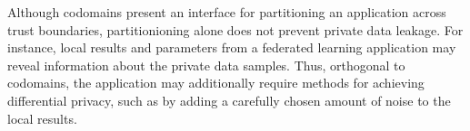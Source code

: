 %
Although codomains present an interface for partitioning an application across
trust boundaries, partitionioning alone does not prevent private data leakage.
%
For instance, local results and parameters from a federated learning
application may reveal information about the private data samples.
%
Thus, orthogonal to codomains, the application may additionally require
methods for achieving differential privacy, such as by adding a carefully
chosen amount of noise to the local results.


%



%


%  
%       

%    
%
%
%
% 
